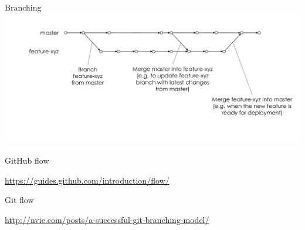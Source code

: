 \begin{frame}{Branching}
    \includegraphics[width=\textwidth]{branching}
\end{frame}

\begin{frame}{GitHub flow}
    \begin{center}
        \url{https://guides.github.com/introduction/flow/}
    \end{center}
\end{frame}

{

}

\begin{frame}{Git flow}
    \begin{center}
        \url{http://nvie.com/posts/a-successful-git-branching-model/}
    \end{center}
\end{frame}

